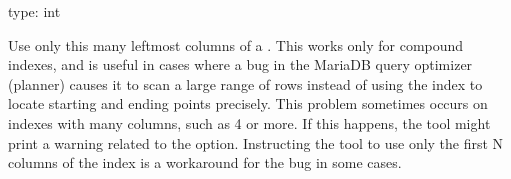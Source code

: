 \documentclass[letterpaper,10pt,english]{sphinxmanual}
\begin{document}

\begin{fulllineitems}
\label{\detokenize{mariadb-schema-change:cmdoption-mariadb-schema-change-chunk-index-columns}}
type: int

Use only this many left\sphinxhyphen{}most columns of a {\hyperref[\detokenize{mariadb-schema-change:cmdoption-mariadb-schema-change-chunk-index}]{}}.  This works
only for compound indexes, and is useful in cases where a bug in the MariaDB
query optimizer (planner) causes it to scan a large range of rows instead
of using the index to locate starting and ending points precisely.  This
problem sometimes occurs on indexes with many columns, such as 4 or more.
If this happens, the tool might print a warning related to the
 option.  Instructing the tool to use only the first
N columns of the index is a workaround for the bug in some cases.

\end{fulllineitems}

\end{document}
